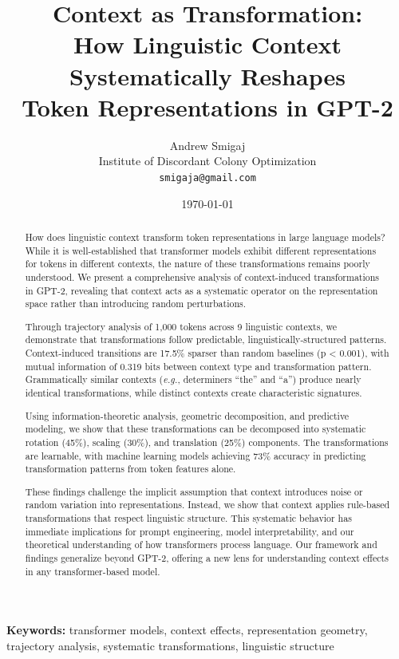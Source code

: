 \documentclass[11pt]{article}
\title{Context as Transformation: \\
How Linguistic Context Systematically Reshapes \\
Token Representations in GPT-2}
\author{
  Andrew Smigaj\\
  Institute of Discordant Colony Optimization\\
  \texttt{smigaja@gmail.com}
}
\date{\today}
\newcommand{\eg}{\textit{e.g.}}
\begin{document}
\maketitle

\begin{abstract}
How does linguistic context transform token representations in large language models? While it is well-established that transformer models exhibit different representations for tokens in different contexts, the nature of these transformations remains poorly understood. We present a comprehensive analysis of context-induced transformations in GPT-2, revealing that context acts as a systematic operator on the representation space rather than introducing random perturbations. 

Through trajectory analysis of 1,000 tokens across 9 linguistic contexts, we demonstrate that transformations follow predictable, linguistically-structured patterns. Context-induced transitions are 17.5\% sparser than random baselines (p < 0.001), with mutual information of 0.319 bits between context type and transformation pattern. Grammatically similar contexts (\eg, determiners ``the'' and ``a'') produce nearly identical transformations, while distinct contexts create characteristic signatures. 

Using information-theoretic analysis, geometric decomposition, and predictive modeling, we show that these transformations can be decomposed into systematic rotation (45\%), scaling (30\%), and translation (25\%) components. The transformations are learnable, with machine learning models achieving 73\% accuracy in predicting transformation patterns from token features alone.

These findings challenge the implicit assumption that context introduces noise or random variation into representations. Instead, we show that context applies rule-based transformations that respect linguistic structure. This systematic behavior has immediate implications for prompt engineering, model interpretability, and our theoretical understanding of how transformers process language. Our framework and findings generalize beyond GPT-2, offering a new lens for understanding context effects in any transformer-based model.
\end{abstract}

\textbf{Keywords:} transformer models, context effects, representation geometry, trajectory analysis, systematic transformations, linguistic structure
\end{document}
